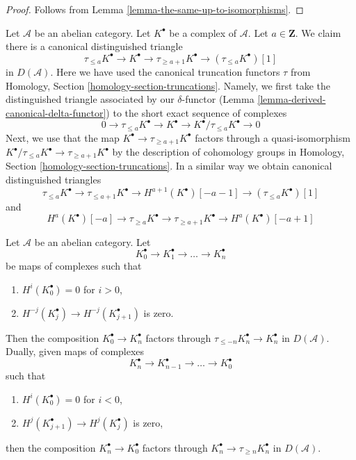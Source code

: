 \begin{proof}
Follows from
Lemma \ref{lemma-the-same-up-to-isomorphisms}.
\end{proof}

\begin{remark}
\label{remark-truncation-distinguished-triangle}
Let $\mathcal{A}$ be an abelian category. Let $K^\bullet$ be a complex
of $\mathcal{A}$. Let $a \in \mathbf{Z}$. We claim there is a canonical
distinguished triangle
$$
\tau_{\leq a}K^\bullet \to K^\bullet \to \tau_{\geq a + 1}K^\bullet \to
(\tau_{\leq a}K^\bullet)[1]
$$
in $D(\mathcal{A})$. Here we have used the canonical truncation functors $\tau$
from Homology, Section \ref{homology-section-truncations}.
Namely, we first take the distinguished
triangle associated by our $\delta$-functor
(Lemma \ref{lemma-derived-canonical-delta-functor})
to the short exact sequence of complexes
$$
0 \to \tau_{\leq a}K^\bullet \to K^\bullet \to
K^\bullet/\tau_{\leq a}K^\bullet \to 0
$$
Next, we use that the map $K^\bullet \to \tau_{\geq a + 1}K^\bullet$
factors through a quasi-isomorphism
$K^\bullet/\tau_{\leq a}K^\bullet \to \tau_{\geq a + 1}K^\bullet$
by the description of cohomology groups in
Homology, Section \ref{homology-section-truncations}.
In a similar way we obtain canonical distinguished triangles
$$
\tau_{\leq a}K^\bullet \to \tau_{\leq a + 1}K^\bullet \to
H^{a + 1}(K^\bullet)[-a-1] \to (\tau_{\leq a}K^\bullet)[1]
$$
and
$$
H^a(K^\bullet)[-a] \to \tau_{\geq a}K^\bullet \to \tau_{\geq a + 1}K^\bullet
\to H^a(K^\bullet)[-a + 1]
$$
\end{remark}

\begin{lemma}
\label{lemma-trick-vanishing-composition}
Let $\mathcal{A}$ be an abelian category. Let
$$
K_0^\bullet \to K_1^\bullet \to \ldots \to K_n^\bullet
$$
be maps of complexes such that
\begin{enumerate}
\item $H^i(K_0^\bullet) = 0$ for $i > 0$,
\item $H^{-j}(K_j^\bullet) \to H^{-j}(K_{j + 1}^\bullet)$ is zero.
\end{enumerate}
Then the composition $K_0^\bullet \to K_n^\bullet$ factors through
$\tau_{\leq -n}K_n^\bullet \to K_n^\bullet$ in $D(\mathcal{A})$.
Dually, given maps of complexes
$$
K_n^\bullet \to K_{n - 1}^\bullet \to \ldots \to K_0^\bullet
$$
such that
\begin{enumerate}
\item $H^i(K_0^\bullet) = 0$ for $i < 0$,
\item $H^j(K_{j + 1}^\bullet) \to H^j(K_j^\bullet)$ is zero,
\end{enumerate}
then the composition $K_n^\bullet \to K_0^\bullet$ factors through
$K_n^\bullet \to \tau_{\geq n}K_n^\bullet$ in $D(\mathcal{A})$.
\end{lemma}

